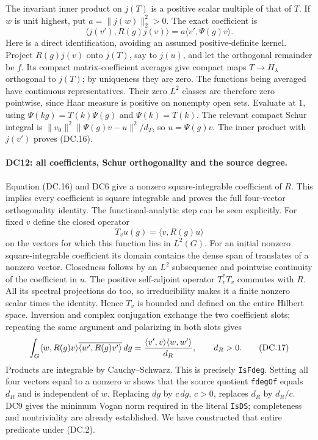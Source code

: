 The invariant inner product on $j(T)$ is a positive scalar multiple of
that of $T$.  If $w$ is unit highest, put $a=\|j(w)\|_2^2>0$.
The exact coefficient is
\[
           \langle j(v'),R(g)j(v)\rangle
                  =a\langle v',\Psi(g)v\rangle.               \tag{DC.16}
\]
Here is a direct identification, avoiding an assumed positive-definite
kernel.  Project $R(g)j(v)$ onto $j(T)$, say to $j(u)$, and let the
orthogonal remainder be $f$.  Its compact matrix-coefficient averages
give compact maps $T\to H_\lambda$ orthogonal to $j(T)$; by uniqueness
they are zero.  The functions being averaged have continuous
representatives.  Their zero $L^2$ classes are therefore zero pointwise,
since Haar measure is positive on nonempty open sets.  Evaluate at $1$,
using $\Psi(kg)=T(k)\Psi(g)$ and $\Psi(k)=T(k)$.  The relevant compact
Schur integral is
$\|v_0\|^2\|\Psi(g)v-u\|^2/d_T$, so $u=\Psi(g)v$.
The inner product with $j(v')$ proves (DC.16).

\paragraph{DC12: all coefficients, Schur orthogonality and the source degree.}
\label{claim:DC12}
Equation (DC.16) and DC6 give a nonzero square-integrable coefficient
of $R$.  This implies every coefficient is square integrable and proves
the full four-vector orthogonality identity.  The functional-analytic
step can be seen explicitly.  For fixed $v$ define the closed operator
\[
 T_vu(g)=\langle v,R(g)u\rangle
\]
on the vectors for which this function lies in $L^2(G)$.  For an initial
nonzero square-integrable coefficient its domain contains the dense
span of translates of a nonzero vector.  Closedness follows by an
$L^2$ subsequence and pointwise continuity of the coefficient in $u$.
The positive self-adjoint operator $T_v^*T_v$ commutes with $R$.
All its spectral projections do too, so irreducibility makes it a
finite nonzero scalar times the identity.  Hence $T_v$ is bounded
and defined on the entire Hilbert space.  Inversion and complex
conjugation exchange the two coefficient slots; repeating the same
argument and polarizing in both slots gives
\[
 \int_G\langle w,R(g)v\rangle
       \overline{\langle w',R(g)v'\rangle}\,dg
       ={\langle v',v\rangle\langle w,w'\rangle\over d_R},
       \qquad d_R>0.                                         \tag{DC.17}
\]
Products are integrable by Cauchy--Schwarz.  This is precisely
\texttt{IsFdeg}.  Setting all four vectors equal to a nonzero $w$
shows that the source quotient \texttt{fdegOf} equals $d_R$ and is
independent of $w$.  Replacing $dg$ by $c\,dg$, $c>0$, replaces
$d_R$ by $d_R/c$.  DC9 gives the minimum Vogan norm required in the
literal \texttt{IsDS}; completeness and nontriviality are already
established.  We have constructed that entire predicate under (DC.2).

